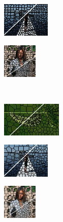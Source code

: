 \begin{figure}
	\begin{subfigure}[b]{0.129\textwidth}
		\includegraphics[height=1.65cm]{pictures/sbd/tp/cropped/tp_0004774_contours}
	\end{subfigure}
	\begin{subfigure}[b]{0.10\textwidth}
		\includegraphics[height=1.65cm]{pictures/fash/tp/cropped/tp_010_contours}
	\end{subfigure}\\
	\begin{subfigure}[b]{0.02\textwidth}
	\end{subfigure}
	\begin{subfigure}[b]{0.16\textwidth}
		\includegraphics[height=1.65cm]{pictures/bsds500/cis/cropped/cis_35028_contours}
	\end{subfigure}
	\begin{subfigure}[b]{0.129\textwidth}
		\includegraphics[height=1.65cm]{pictures/sbd/cis/cropped/cis_0004774_contours}
	\end{subfigure}
	\begin{subfigure}[b]{0.10\textwidth}
		\includegraphics[height=1.65cm]{pictures/fash/cis/cropped/cis_010_contours}
	\end{subfigure}
	\begin{subfigure}[b]{0.02\textwidth}

\end{subfigure}
\end{figure}
